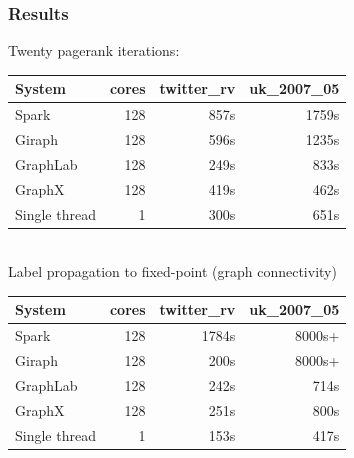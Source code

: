 \documentclass[aspectratio=43]{beamer}
\newenvironment{changemargin}[1]{%
  \begin{list}{}{%
    \setlength{\topsep}{0pt}%
    \setlength{\leftmargin}{#1}%
    \setlength{\rightmargin}{1em}
    \setlength{\listparindent}{\parindent}%
    \setlength{\itemindent}{\parindent}%
    \setlength{\parsep}{\parskip}%
  }%
  \item[]}{\end{list}}
\begin{document}
\begin{frame}
  \frametitle{Results}
  \begin{changemargin}{1cm}
Twenty pagerank iterations:
\hspace*{.5cm}\begin{tabular}{lrrr}
System &cores 	&twitter\_rv 	&uk\_2007\_05\\ \hline
Spark 	&128 	&857s 	&1759s\\
Giraph 	&128 	&596s 	&1235s\\
GraphLab 	&128 	&249s 	&833s\\
GraphX 	&128 	&419s 	&462s\\
Single thread 	&1 	&300s	&651s
\end{tabular}
~\\[1em]
Label propagation to fixed-point (graph connectivity)
\hspace*{.5cm}\begin{tabular}{lrrr}
System 	&cores 	&twitter\_rv 	&uk\_2007\_05\\ \hline
Spark 	&128 	&1784s 	&8000s+\\
Giraph 	&128 	&200s 	&8000s+\\
GraphLab 	&128 	&242s 	&714s\\
GraphX 	&128 	&251s 	&800s\\
Single thread 	&1 	&153s	&417s
\end{tabular}


  \end{changemargin}
\end{frame}
\end{document}
